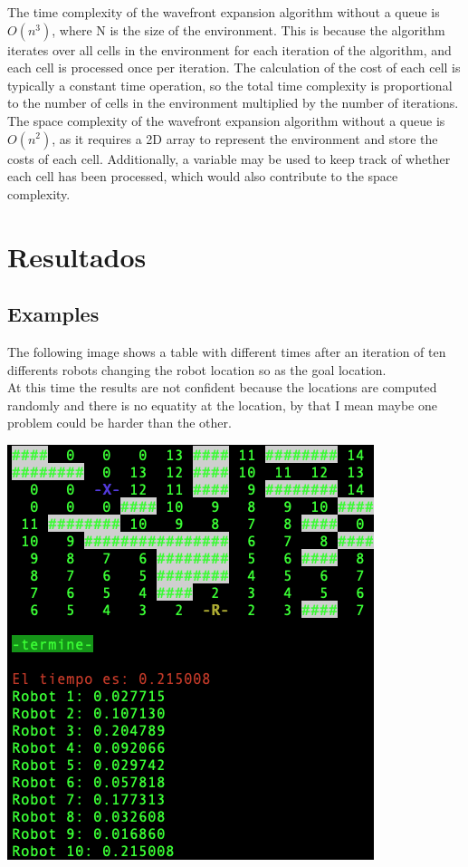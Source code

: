 \documentclass[oneside,twocolumn]{article}
\begin{document}
The time complexity of the wavefront expansion algorithm without a queue is $O(n^3)$, where N is the size of the environment. This is because the algorithm iterates over all cells in the environment for each iteration of the algorithm, and each cell is processed once per iteration. The calculation of the cost of each cell is typically a constant time operation, so the total time complexity is proportional to the number of cells in the environment multiplied by the number of iterations.\\

The space complexity of the wavefront expansion algorithm without a queue is $O(n^2)$, as it requires a 2D array to represent the environment and store the costs of each cell. Additionally, a variable may be used to keep track of whether each cell has been processed, which would also contribute to the space complexity.\\

\newpage
\twocolumn
\section{Resultados}

\subsection{Examples}
The following image shows a table with different times after an iteration of ten differents robots changing the robot location so as the goal location.\\

At this time the results are not confident because the locations are computed randomly and there is no equatity at the location, by that I mean maybe one problem could be harder than the other.

\includegraphics[scale=0.5]{image1.png}
\end{document}
